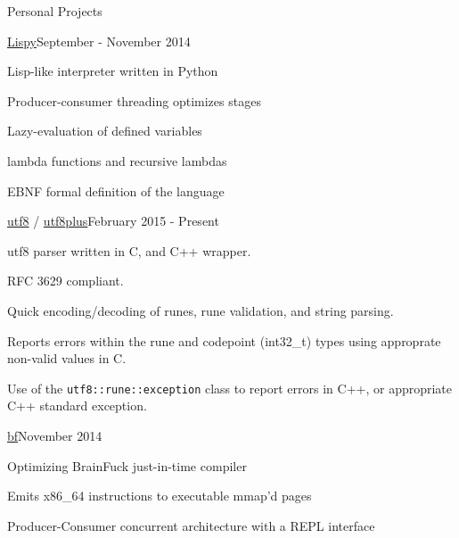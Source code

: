 \documentclass{resume} %
\begin{document}
\clearpage

\begin{rSection}{Personal Projects}

\begin{rSubsection}{\href{http://github.com/cptaffe/lispy}{Lispy}}{September - November 2014}{}{}

	\item Lisp-like interpreter written in Python
	\item Producer-consumer threading optimizes stages
	\item Lazy-evaluation of defined variables
	\item lambda functions and recursive lambdas
	\item EBNF formal definition of the language
\end{rSubsection}

\begin{rSubsection}{\href{http://github.com/cptaffe/utf8}{utf8} / \href{http://github.com/cptaffe/utf8plus}{utf8plus}}{February 2015 - Present}{}{}

	\item utf8 parser written in C, and C++ wrapper.
	\item RFC 3629 compliant.
	\item Quick encoding/decoding of runes, rune validation, and string parsing.
	\item Reports errors within the rune and codepoint (int32\_t) types using approprate non-valid values in C.
	\item Use of the \verb!utf8::rune::exception! class to report errors in C++, or appropriate C++ standard exception.
\end{rSubsection}

\begin{rSubsection}{\href{http://github.com/cptaffe/bf}{bf}}{November 2014}{}{}

	\item Optimizing BrainFuck just-in-time compiler
	\item Emits x86\_64 instructions to executable mmap'd pages
	\item Producer-Consumer concurrent architecture with a REPL interface
\end{rSubsection}

\end{rSection}

\end{document}
